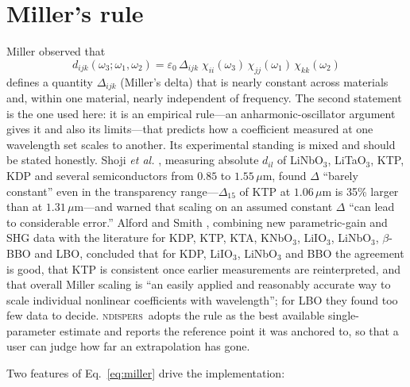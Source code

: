 \documentclass[aps,pra,preprint,amsmath,amssymb,nofootinbib,superscriptaddress]{revtex4-2}
\newcommand{\ndispers}{\textsc{ndispers}}
\begin{document}
\section{Miller's rule}
\label{sec:miller}

Miller \cite{Miller1964} observed that
\begin{equation}
  d_{ijk}(\omega_3;\omega_1,\omega_2)
  = \varepsilon_0\,\Delta_{ijk}\;\chi_{ii}(\omega_3)\,\chi_{jj}(\omega_1)\,\chi_{kk}(\omega_2)
  \label{eq:miller}
\end{equation}
defines a quantity $\Delta_{ijk}$ (Miller's delta) that is nearly constant
across materials and, within one material, nearly independent of frequency.
The second statement is the one used here: it is an empirical rule---an
anharmonic-oscillator argument gives it and also its limits---that
predicts how a coefficient measured at one wavelength set scales to
another. Its experimental standing is mixed and should be stated
honestly. Shoji \emph{et al.} \cite{Shoji1997}, measuring absolute
$d_{il}$ of LiNbO$_3$, LiTaO$_3$, KTP, KDP and several semiconductors
from $0.85$ to $1.55\,\mu$m, found $\Delta$ ``barely constant'' even in the
transparency range---$\Delta_{15}$ of KTP at $1.06\,\mu$m is 35\% larger
than at $1.31\,\mu$m---and warned that scaling on an assumed constant
$\Delta$ ``can lead to considerable error.'' Alford and Smith
\cite{Alford2001}, combining new parametric-gain and SHG data with the
literature for KDP, KTP, KTA, KNbO$_3$, LiIO$_3$, LiNbO$_3$, $\beta$-BBO and
LBO, concluded that for KDP, LiIO$_3$, LiNbO$_3$ and BBO the agreement is
good, that KTP is consistent once earlier measurements are reinterpreted,
and that overall Miller scaling is ``an easily applied and reasonably
accurate way to scale individual nonlinear coefficients with
wavelength''; for LBO they found too few data to decide. \ndispers\
adopts the rule as the best available single-parameter estimate and
reports the reference point it was anchored to, so that a user can judge
how far an extrapolation has gone.

Two features of Eq.~\eqref{eq:miller} drive the implementation:
\end{document}
